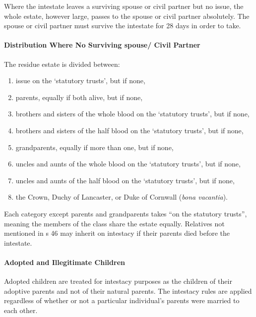 \documentclass[
]{article}
\providecommand{\tightlist}{%
  \setlength{\itemsep}{0pt}\setlength{\parskip}{0pt}}
\begin{document}
Where the intestate leaves a surviving spouse or civil partner but no
issue, the whole estate, however large, passes to the spouse or civil
partner absolutely. The spouse or civil partner must survive the
intestate for 28 days in order to take.

\hypertarget{distribution-where-no-surviving-spouse-civil-partner}{%
\paragraph{Distribution Where No Surviving spouse/ Civil
Partner}\label{distribution-where-no-surviving-spouse-civil-partner}}

The residue estate is divided between:

\begin{enumerate}
\def\labelenumi{\arabic{enumi}.}
\tightlist
\item
  issue on the `statutory trusts', but if none,
\item
  parents, equally if both alive, but if none,
\item
  brothers and sisters of the whole blood on the `statutory trusts', but
  if none,
\item
  brothers and sisters of the half blood on the `statutory trusts', but
  if none,
\item
  grandparents, equally if more than one, but if none,
\item
  uncles and aunts of the whole blood on the `statutory trusts', but if
  none,
\item
  uncles and aunts of the half blood on the `statutory trusts', but if
  none,
\item
  the Crown, Duchy of Lancaster, or Duke of Cornwall (\emph{bona
  vacantia}).
\end{enumerate}

Each category except parents and grandparents takes ``on the statutory
trusts'', meaning the members of the class share the estate equally.
Relatives not mentioned in s 46 may inherit on intestacy if their
parents died before the intestate.

\hypertarget{adopted-and-illegitimate-children}{%
\paragraph{Adopted and Illegitimate
Children}\label{adopted-and-illegitimate-children}}

Adopted children are treated for intestacy purposes as the children of
their adoptive parents and not of their natural parents. The intestacy
rules are applied regardless of whether or not a particular individual's
parents were married to each other.
\end{document}

